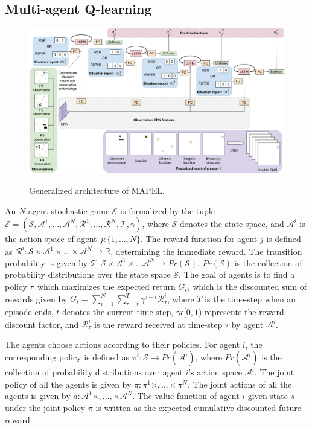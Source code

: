 \documentclass[conference]{IEEEtran}
\begin{document}
\subsection{Multi-agent Q-learning}
\begin{figure}[t]
    \centering
        \includegraphics[scale=0.47]{dqn_ma} \\
        \vspace{1mm}
     \caption{Generalized architecture of MAPEL.}
     \label{fig:architecture}
\end{figure}


An $N$-agent stochastic game $\mathcal{E}$ is formalized by the tuple $\mathcal{E} = (\mathcal{S},\mathcal{A}^1,\dots,\mathcal{A}^N,\mathcal{R}^1,\dots,\mathcal{R}^N,\mathcal{T},\gamma)$, where $\mathcal{S}$ denotes the state space, and $\mathcal{A}^i$ is the action space of agent $j\epsilon\{1,\dots,N\}$. The reward function for agent $j$ is defined as $\mathcal{R}^i:\mathcal{S}\times\mathcal{A}^1\times\dots \times\mathcal{A}^N \rightarrow \mathbb{R}$, determining the immediate reward. The transition probability is given by $\mathcal{T}:\mathcal{S}\times\mathcal{A}^1\times\dots\mathcal{A}^N \rightarrow Pr(\mathcal{S})$. $Pr(\mathcal{S})$ is the collection of probability distributions over the state space $\mathcal{S}$.  The goal of agents is to find a policy $\pi$ which maximizes the expected return $G_t$, which is the discounted sum of rewards given by $G_t = \sum_{i=1}^{N}\sum_{\tau=t}^{T}\gamma^{\tau-t}\mathcal{R}^{i}_{\tau}$, where $T$ is the time-step when an episode ends, $t$ denotes the current time-step, $\gamma \epsilon [0,1)$ represents the reward discount factor, and $\mathcal{R}^{i}_{\tau}$ is the reward received at time-step $\tau$ by agent $\mathcal{A}^i$.

The agents choose actions according to their policies. For agent $i$, the corresponding policy is defined as $\pi^{i}:\mathcal{S}\rightarrow Pr(\mathcal{A}^i)$, where $Pr(\mathcal{A}^i)$ is the collection of probability distributions over agent $i$'s action space $\mathcal{A}^i$. The joint policy of all the agents is given by $\pi : \pi^1\times,\dots\times\pi^N$. The joint actions of all the agents is given by $a : \mathcal{A}^1\times,\dots,\times\mathcal{A}^N$. The value function of agent $i$ given state $s$ under the joint policy $\pi$ is written as the expected cumulative discounted future reward:
\end{document}

